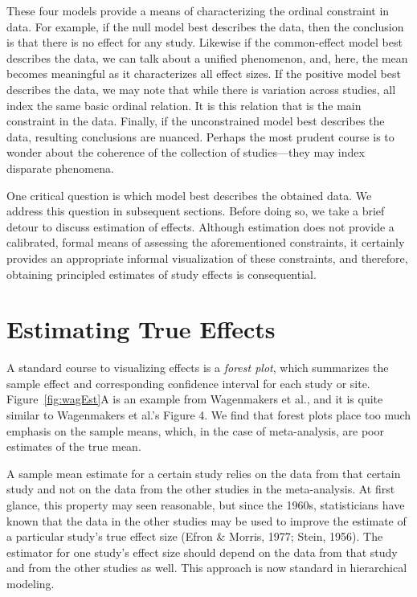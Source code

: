 \documentclass[english,man]{apa6}
\theoremstyle{definition}
\theoremstyle{definition}
\theoremstyle{remark}
\begin{document}
These four models provide a means of characterizing the ordinal
constraint in data. For example, if the null model best describes the
data, then the conclusion is that there is no effect for any study.
Likewise if the common-effect model best describes the data, we can talk
about a unified phenomenon, and, here, the mean becomes meaningful as it
characterizes all effect sizes. If the positive model best describes the
data, we may note that while there is variation across studies, all
index the same basic ordinal relation. It is this relation that is the
main constraint in the data. Finally, if the unconstrained model best
describes the data, resulting conclusions are nuanced. Perhaps the most
prudent course is to wonder about the coherence of the collection of
studies---they may index disparate phenomena.

One critical question is which model best describes the obtained data.
We address this question in subsequent sections. Before doing so, we
take a brief detour to discuss estimation of effects. Although
estimation does not provide a calibrated, formal means of assessing the
aforementioned constraints, it certainly provides an appropriate
informal visualization of these constraints, and therefore, obtaining
principled estimates of study effects is consequential.

\section{Estimating True Effects}\label{estimating-true-effects}

A standard course to visualizing effects is a \emph{forest plot}, which
summarizes the sample effect and corresponding confidence interval for
each study or site. Figure~\ref{fig:wagEst}A is an example from
Wagenmakers et al., and it is quite similar to Wagenmakers et al.'s
Figure 4. We find that forest plots place too much emphasis on the
sample means, which, in the case of meta-analysis, are poor estimates of
the true mean.

A sample mean estimate for a certain study relies on the data from that
certain study and not on the data from the other studies in the
meta-analysis. At first glance, this property may seen reasonable, but
since the 1960s, statisticians have known that the data in the other
studies may be used to improve the estimate of a particular study's true
effect size (Efron \& Morris, 1977; Stein, 1956). The estimator for one
study's effect size should depend on the data from that study and from
the other studies as well. This approach is now standard in hierarchical
modeling.
\end{document}
